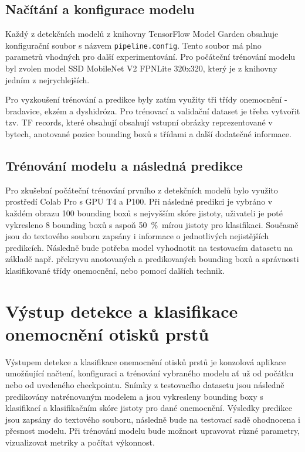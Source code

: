 \subsection*{Načítání a konfigurace modelu}
Každý z detekčních modelů z knihovny TensorFlow Model Garden obsahuje konfigurační soubor s názvem \verb=pipeline.config=. Tento soubor má plno parametrů vhodných pro další experimentování. Pro počáteční trénování modelu byl zvolen model SSD MobileNet V2 FPNLite 320x320, který je z knihovny jedním z nejrychlejších.

Pro vyzkoušení trénování a predikce byly zatím využity tři třídy onemocnění - bradavice, ekzém a dyshidróza. Pro trénovací a validační dataset je třeba vytvořit tzv. TF records, které obsahují obsahují vstupní obrázky reprezentované v bytech, anotované pozice bounding boxů s třídami a další dodatečné informace.

\subsection*{Trénování modelu a následná predikce}
Pro zkušební počáteční trénování prvního z detekčních modelů bylo využito prostředí Colab Pro s GPU T4 a P100. Při následné predikci je vybráno v každém obrazu 100 bounding boxů s nejvyšším skóre jistoty, uživateli je poté vykresleno 8 bounding boxů s aspoň 50~\%~mírou jistoty pro klasifikaci. Současně jsou do textového souboru zapsány i informace o jednotlivých nejistějších predikcích. Následně bude potřeba model vyhodnotit na testovacím datasetu na základě např. překryvu anotovaných a predikovaných bounding boxů a správnosti klasifikované třídy onemocnění, nebo pomocí dalších technik.


\section{Výstup detekce a klasifikace onemocnění otisků prstů}
Výstupem detekce a klasifikace onemocnění otisků prstů je konzolová aplikace umožňující načtení, konfiguraci a trénování vybraného modelu ať už od počátku nebo od uvedeného checkpointu. Snímky z testovacího datasetu jsou následně predikovány natrénovaným modelem a jsou vykresleny bounding boxy s klasifikací a klasifikačním skóre jistoty pro dané onemocnění. Výsledky predikce jsou zapsány do textového souboru, následně bude na testovací sadě ohodnocena i přesnost modelu. Při trénování modelu bude možnost upravovat různé parametry, vizualizovat metriky a počítat výkonnost.

